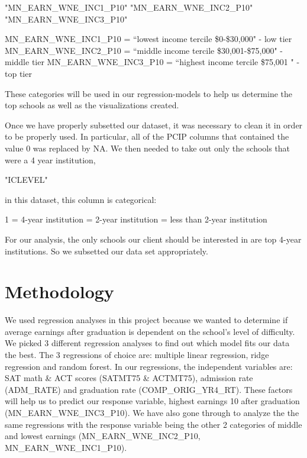 \documentclass{article}
\begin{document}
\begin{Schunk}
\begin{Soutput}
[1] "MN_EARN_WNE_INC1_P10" "MN_EARN_WNE_INC2_P10" "MN_EARN_WNE_INC3_P10"
\end{Soutput}
\end{Schunk}
\begin{flushleft}
MN\_EARN\_WNE\_INC1\_P10 = ``lowest income tercile \$0-\$30,000" - low tier \newline
MN\_EARN\_WNE\_INC2\_P10 = ``middle income tercile \$30,001-\$75,000" - middle tier \newline
MN\_EARN\_WNE\_INC3\_P10 = ``highest income tercile \$75,001  " - top tier \newline
\end{flushleft}
These categories will be used in our regression-models to help us determine the top schools as well as the visualizations created.

  Once we have properly subsetted our dataset, it was necessary to clean it in order to be  properly used.  In particular, all of the PCIP columns that contained the value 0 was replaced by NA.  We then needed to take out only the schools that were a 4 year institution, 
\begin{Schunk}
\begin{Soutput}
[1] "ICLEVEL"
\end{Soutput}
\end{Schunk}
in this dataset, this column is categorical: 
  \begin{flushleft}
  1 = 4-year institution  = 2-year institution  = less than 2-year institution \newline
  \end{flushleft}
  For our analysis, the only schools our client should be interested in are top 4-year institutions.  So we subsetted our data set appropriately.

\section{Methodology}

  We used regression analyses in this project because we wanted to determine if average earnings after graduation is dependent on the school's level of difficulty.  
We picked 3 different regression analyses to find out which model fits our data the best.  
The 3 regressions of choice are: multiple linear regression, ridge regression and random forest.   
In our regressions, the independent variables are: SAT  math \& ACT scores (SATMT75 \& ACTMT75), admission rate (ADM\_RATE) and graduation rate (COMP\_ORIG\_YR4\_RT).  These factors will help us to predict our 
response variable, highest earnings 10 after graduation (MN\_EARN\_WNE\_INC3\_P10).  We have also gone through to analyze the the same regressions with the response variable being the other 2 categories of middle and lowest earnings (MN\_EARN\_WNE\_INC2\_P10, MN\_EARN\_WNE\_INC1\_P10).  
\end{document}
